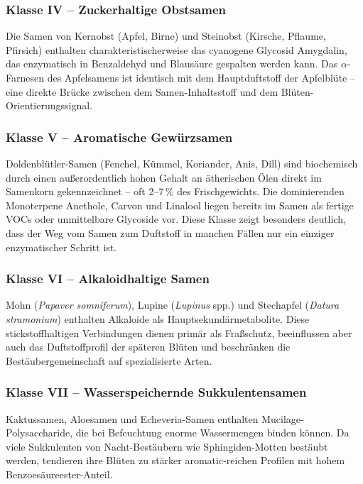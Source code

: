 \documentclass[12pt,a4paper]{article}
\begin{document}
\subsubsection{Klasse IV -- Zuckerhaltige Obstsamen}

Die Samen von Kernobst (Apfel, Birne) und Steinobst (Kirsche, Pflaume, Pfirsich) enthalten charakteristischerweise das cyanogene Glycosid Amygdalin, das enzymatisch in Benzaldehyd und Blaus\"aure gespalten werden kann. Das $\alpha$-Farnesen des Apfelsamens ist identisch mit dem Hauptduftstoff der Apfelbl\"ute -- eine direkte Br\"ucke zwischen dem Samen-Inhaltsstoff und dem Bl\"uten-Orientierungssignal.

\subsubsection{Klasse V -- Aromatische Gew\"urzsamen}

Doldenbl\"utler-Samen (Fenchel, K\"ummel, Koriander, Anis, Dill) sind biochemisch durch einen au{\ss}erordentlich hohen Gehalt an \"atherischen \"Olen direkt im Samenkorn gekennzeichnet -- oft 2--7\,\% des Frischgewichts. Die dominierenden Monoterpene Anethole, Carvon und Linalool liegen bereits im Samen als fertige VOCs oder unmittelbare Glycoside vor. Diese Klasse zeigt besonders deutlich, dass der Weg vom Samen zum Duftstoff in manchen F\"allen nur ein einziger enzymatischer Schritt ist.

\subsubsection{Klasse VI -- Alkaloidhaltige Samen}

Mohn (\textit{Papaver somniferum}), Lupine (\textit{Lupinus} spp.) und Stechapfel (\textit{Datura stramonium}) enthalten Alkaloide als Hauptsekund\"armetabolite. Diese stickstoffhaltigen Verbindungen dienen prim\"ar als Fra{\ss}schutz, beeinflussen aber auch das Duftstoffprofil der sp\"ateren Bl\"uten und beschr\"anken die Best\"aubergemeinschaft auf spezialisierte Arten.

\subsubsection{Klasse VII -- Wasserspeichernde Sukkulentensamen}

Kaktussamen, Aloesamen und Echeveria-Samen enthalten Mucilage-Polysaccharide, die bei Befeuchtung enorme Wassermengen binden k\"onnen. Da viele Sukkulenten von Nacht-Best\"aubern wie Sphingiden-Motten best\"aubt werden, tendieren ihre Bl\"uten zu st\"arker aromatic-reichen Profilen mit hohem Benzoes\"aureester-Anteil.
\end{document}

